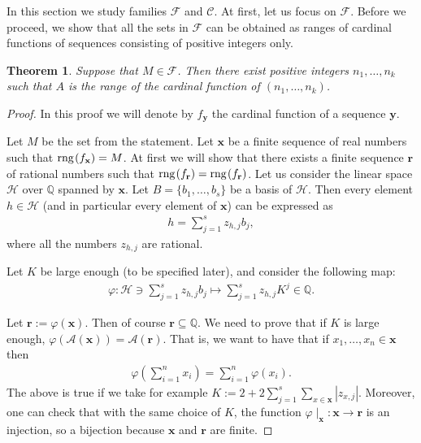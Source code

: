 \documentclass{amsart}
\newtheorem{theorem}{Theorem}[section]
\theoremstyle{definition}
\newcommand{\rng}{{\rm rng} \hspace{0.03cm}}
\begin{document}
In this section we study families $\mathcal{F}$ and $\mathcal{C}$. At first, let us focus on $\mathcal{F}$. Before we proceed, we show that all the sets in $\mathcal{F}$ can be obtained as ranges of cardinal functions of sequences consisting of positive integers only.

\begin{theorem}\label{ThmNaturalneStarcza}
Suppose that $M\in \mathcal{F}$. Then there exist positive integers $n_{1},\ldots ,n_{k}$ such that $A$ is the range of the cardinal function of $(n_{1},\ldots ,n_{k})$.
\end{theorem}
\begin{proof}
In this proof we will denote by $f_{\mathbf{y}}$ the cardinal function of a sequence $\mathbf{y}$.

Let $M$ be the set from the statement. Let $\mathbf{x}$ be a finite sequence of real numbers such that $\rng (f_{\mathbf{x}})=M$. %
At first we will show that there exists a finite sequence $\mathbf{r}$ of rational numbers such that $\rng (f_{\mathbf{r}})=\rng (f_{\mathbf{r}})$. Let us consider the linear space $\mathcal{H}$ over $\mathbb{Q}$ spanned by $\mathbf{x}$. Let $B=\{b_{1},\ldots ,b_{s}\}$ be a basis of $\mathcal{H}$. Then every element $h\in\mathcal{H}$ (and in particular every element of $\mathbf{x}$) can be expressed as
\begin{align*}
h = \sum_{j=1}^{s}z_{h,j}b_{j},
\end{align*}
where all the numbers $z_{h,j}$ are rational.

Let $K$ be large enough (to be specified later), and consider the following map:
\begin{align*}
\varphi : \mathcal{H}\ni \sum_{j=1}^{s}z_{h,j}b_{j} \mapsto \sum_{j=1}^{s}z_{h,j}K^{j} \in \mathbb{Q}.
\end{align*}




Let $\mathbf{r}:=\varphi (\mathbf{x})$. Then of course $\mathbf{r}\subseteq \mathbb{Q}$. We need to prove that if $K$ is large enough, $\varphi (\mathcal{A}(\mathbf{x}))=\mathcal{A}(\mathbf{r})$. That is, we want to have that if $x_{1},\ldots ,x_{n}\in\mathbf{x}$ then
\begin{align*}
\varphi\left(\sum_{i=1}^{n} x_{i}\right) = \sum_{i=1}^{n} \varphi (x_{i}).
\end{align*}
The above is true if we take for example $K:= 2+ 2\sum_{j=1}^{s} \sum_{x\in\mathbf{x}} |z_{x,j}|$. Moreover, one can check that with the same choice of $K$, the function $\varphi\mid_{\mathbf{x}}:\mathbf{x}\to \mathbf{r}$ is an injection, so a bijection because $\mathbf{x}$ and $\mathbf{r}$ are finite.





\end{proof}
\end{document}
